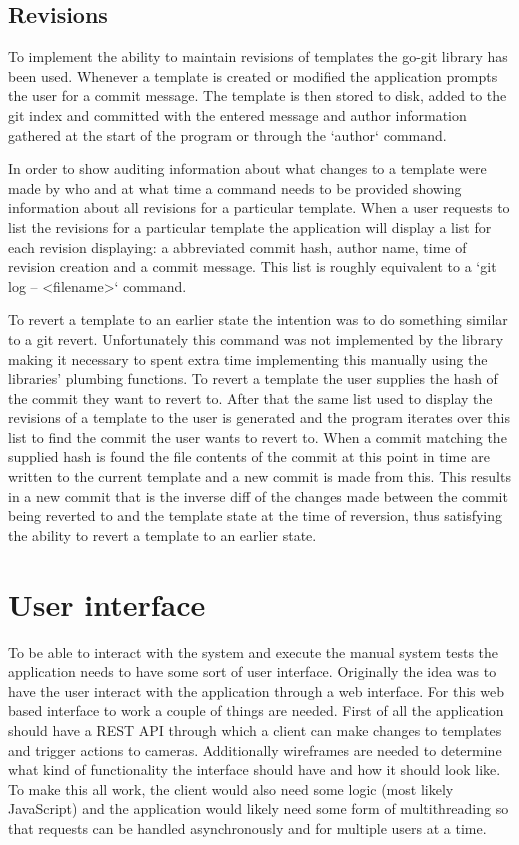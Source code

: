 \subsection{Revisions}
To implement the ability to maintain revisions of templates the go-git library has been used.
Whenever a template is created or modified the application prompts the user for a commit message.
The template is then stored to disk, added to the git index and committed with the entered message and author information gathered at the start of the program or through the `author` command.

In order to show auditing information about what changes to a template were made by who and at what time a command needs to be provided showing information about all revisions for a particular template.
When a user requests to list the revisions for a particular template the application will display a list for each revision displaying: a abbreviated commit hash, author name, time of revision creation and a commit message.
This list is roughly equivalent to a `git log -- <filename>` command.

To revert a template to an earlier state the intention was to do something similar to a git revert.
Unfortunately this command was not implemented by the library making it necessary to spent extra time implementing this manually using the libraries' plumbing functions.
To revert a template the user supplies the hash of the commit they want to revert to.
After that the same list used to display the revisions of a template to the user is generated and the program iterates over this list to find the commit the user wants to revert to.
When a commit matching the supplied hash is found the file contents of the commit at this point in time are written to the current template and a new commit is made from this.
This results in a new commit that is the inverse diff of the changes made between the commit being reverted to and the template state at the time of reversion, thus satisfying the ability to revert a template to an earlier state.


\section{User interface}
To be able to interact with the system and execute the manual system tests the application needs to have some sort of user interface.
Originally the idea was to have the user interact with the application through a web interface.
For this web based interface to work a couple of things are needed.
First of all the application should have a REST API through which a client can make changes to templates and trigger actions to cameras.
Additionally wireframes are needed to determine what kind of functionality the interface should have and how it should look like.
To make this all work, the client would also need some logic (most likely JavaScript) and the application would likely need some form of multithreading so that requests can be handled asynchronously and for multiple users at a time.

